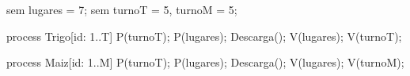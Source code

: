 sem lugares = 7;
sem turnoT = 5, turnoM = 5;

process Trigo[id: 1..T]
{
    P(turnoT);
    P(lugares);
    Descarga();
    V(lugares);
    V(turnoT);
}

process Maiz[id: 1..M]
{
    P(turnoT);
    P(lugares);
    Descarga();
    V(lugares);
    V(turnoM);
}